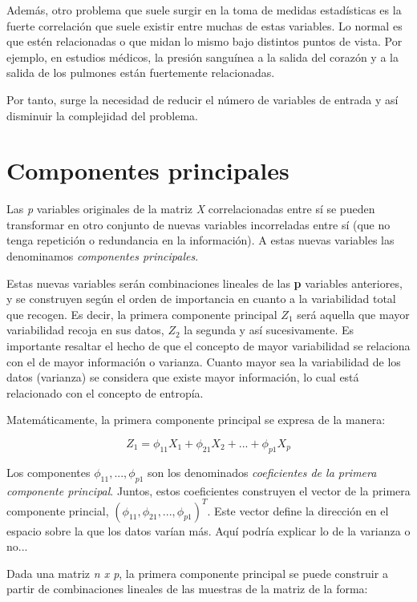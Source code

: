 \documentclass[12pt,a4paper,Spanish]{book}
\begin{document}
Además, otro problema que suele surgir en la toma de medidas estadísticas es la fuerte correlación que suele existir entre muchas de estas variables. Lo normal es que estén relacionadas o que midan lo mismo bajo distintos puntos de vista. Por ejemplo, en
estudios médicos, la presión sanguínea a la salida del corazón y a la salida de los pulmones
están fuertemente relacionadas. 

Por tanto, surge la necesidad de reducir el número de variables de entrada y así disminuir la complejidad del problema.


\section{Componentes principales}

Las \textit{p} variables originales de la matriz \textit{X} correlacionadas  entre sí se pueden transformar en otro conjunto de nuevas variables incorreladas entre sí (que no tenga repetición o redundancia en la información). A estas nuevas variables las denominamos \textit{componentes principales}.

Estas nuevas variables serán combinaciones lineales de las \textbf{p} variables anteriores, y se construyen según el orden de importancia en cuanto a la variabilidad total que recogen. Es decir, la primera componente principal $Z_1$ será aquella que mayor variabilidad recoja en sus datos, $Z_2$ la segunda y así sucesivamente. Es importante resaltar el hecho de que el concepto de mayor variabilidad se relaciona con el de mayor información o varianza. Cuanto mayor sea la variabilidad de los datos (varianza) se considera que existe mayor información, lo cual está relacionado con el concepto de entropía.

Matemáticamente, la primera componente principal se expresa de la manera:

\begin{equation}
Z_1=\phi_{11}X_1 + \phi_{21}X_2 + ... + \phi_{p1}X_p
\end{equation}

Los componentes $\phi_{11},...,\phi_{p1}$ son los denominados \textit{coeficientes de la primera componente principal}. Juntos, estos coeficientes construyen el vector de la primera componente princial, $(\phi_{11}, \phi_{21},...,\phi_{p1})^T$. Este vector define la dirección en el espacio sobre la que los datos varían más. Aquí podría explicar lo de la varianza o no...

Dada una matriz \textit{n x p}, la primera componente principal se puede construir a partir de combinaciones lineales de las muestras de la matriz de la forma:
\end{document}
